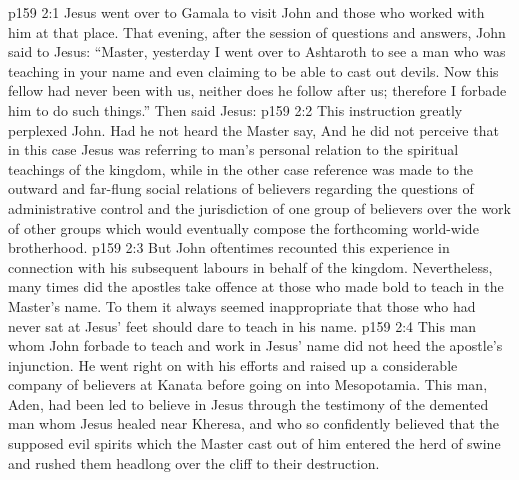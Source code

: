 \vs p159 2:1 Jesus went over to Gamala to visit John and those who worked with him at that place. That evening, after the session of questions and answers, John said to Jesus: “Master, yesterday I went over to Ashtaroth to see a man who was teaching in your name and even claiming to be able to cast out devils. Now this fellow had never been with us, neither does he follow after us; therefore I forbade him to do such things.” Then said Jesus: 
\vs p159 2:2 This instruction greatly perplexed John. Had he not heard the Master say,  And he did not perceive that in this case Jesus was referring to man’s personal relation to the spiritual teachings of the kingdom, while in the other case reference was made to the outward and far\hyp{}flung social relations of believers regarding the questions of administrative control and the jurisdiction of one group of believers over the work of other groups which would eventually compose the forthcoming world\hyp{}wide brotherhood.
\vs p159 2:3 But John oftentimes recounted this experience in connection with his subsequent labours in behalf of the kingdom. Nevertheless, many times did the apostles take offence at those who made bold to teach in the Master’s name. To them it always seemed inappropriate that those who had never sat at Jesus’ feet should dare to teach in his name.
\vs p159 2:4 This man whom John forbade to teach and work in Jesus’ name did not heed the apostle’s injunction. He went right on with his efforts and raised up a considerable company of believers at Kanata before going on into Mesopotamia. This man, Aden, had been led to believe in Jesus through the testimony of the demented man whom Jesus healed near Kheresa, and who so confidently believed that the supposed evil spirits which the Master cast out of him entered the herd of swine and rushed them headlong over the cliff to their destruction.
